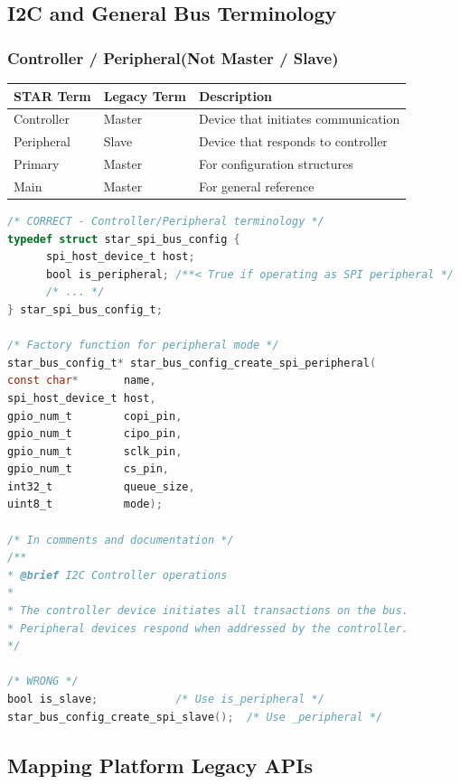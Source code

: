 \subsection{I2C and General Bus Terminology}

\subsubsection{Controller / Peripheral(Not Master / Slave)}

\begin{center}
\begin{tabular}{|l|l|l|}
\hline
\textbf{STAR Term} & \textbf{Legacy Term} & \textbf{Description} \\
\hline
Controller & Master & Device that initiates communication \\
\hline
Peripheral & Slave & Device that responds to controller \\
\hline
Primary & Master & For configuration structures \\
\hline
Main & Master & For general reference \\
\hline
\end{tabular}
\end{center}

\begin{lstlisting}[language=C]
/* CORRECT - Controller/Peripheral terminology */
typedef struct star_spi_bus_config {
      spi_host_device_t host;
      bool is_peripheral; /**< True if operating as SPI peripheral */
      /* ... */
} star_spi_bus_config_t;

/* Factory function for peripheral mode */
star_bus_config_t* star_bus_config_create_spi_peripheral(
const char*       name,
spi_host_device_t host,
gpio_num_t        copi_pin,
gpio_num_t        cipo_pin,
gpio_num_t        sclk_pin,
gpio_num_t        cs_pin,
int32_t           queue_size,
uint8_t           mode);

/* In comments and documentation */
/**
* @brief I2C Controller operations
*
* The controller device initiates all transactions on the bus.
* Peripheral devices respond when addressed by the controller.
*/

/* WRONG */
bool is_slave;            /* Use is_peripheral */
star_bus_config_create_spi_slave();  /* Use _peripheral */
\end{lstlisting}

\subsection{Mapping Platform Legacy APIs}

